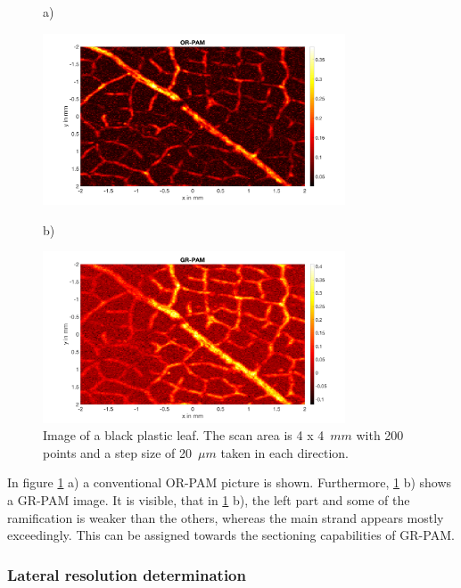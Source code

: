 \begin{figure}[H]
	a)
	\begin{minipage}{\textwidth}
		\centering		
		\includegraphics[width = 0.8\textwidth, height=0.38\textheight]{04_ex-results_of_PAM/images/blackleaf_OR.png}
	\end{minipage}	
	b)
	\begin{minipage}{\textwidth}
		\centering		
		\includegraphics[width = 0.8\textwidth, height=0.38\textheight]{04_ex-results_of_PAM/images/blackleaf_GR.png}
	\end{minipage}
	
	\caption{Image of a black plastic leaf. The scan area is 4 x 4~$mm$ with 200 points and a step size of 20~$\mu m$ taken in each direction.}
	\label{fig:imgGRblackleaf}
\end{figure}

In figure \ref{fig:imgGRblackleaf} a) a conventional OR-PAM picture is shown. Furthermore, \ref{fig:imgGRblackleaf} b) shows a GR-PAM image. It is visible, that in \ref{fig:imgGRblackleaf} b), the left part and some of the ramification is weaker than the others, whereas the main strand appears mostly exceedingly. This can be assigned towards the sectioning capabilities of GR-PAM. 

\subsubsection{Lateral resolution determination}

